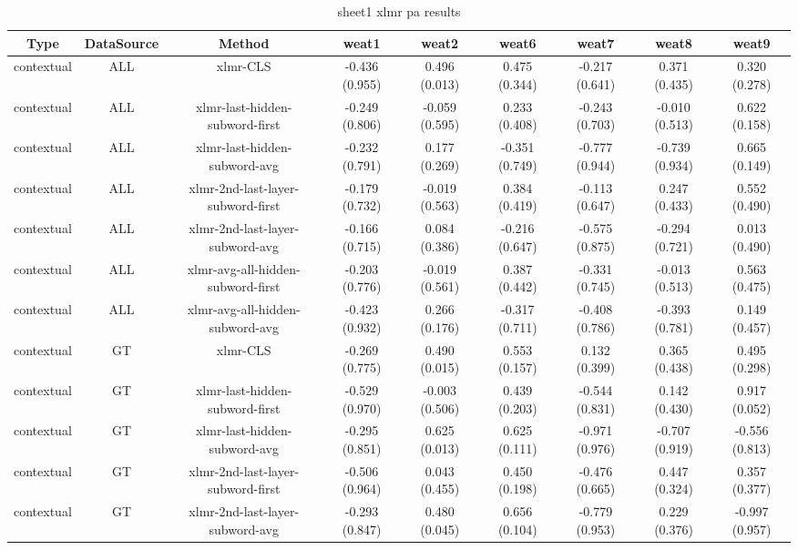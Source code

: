 \begin{sidewaystable}[htb]
    \centering
    \caption{sheet1 xlmr pa results}
    \label{appendix_tab:sheet1_xlmr_pa_results}
    \small
    \begin{tabular}{@{}ccccccccc@{}}
        \toprule
        Type & DataSource & Method & weat1 & weat2 & weat6 & weat7 & weat8 & weat9 \\
        \midrule
        contextual & ALL & xlmr-CLS & -0.436 (0.955) & 0.496 (0.013) & 0.475 (0.344) & -0.217 (0.641) & 0.371 (0.435) & 0.320 (0.278) \\
        contextual & ALL & xlmr-last-hidden-subword-first & -0.249 (0.806) & -0.059 (0.595) & 0.233 (0.408) & -0.243 (0.703) & -0.010 (0.513) & 0.622 (0.158) \\
        contextual & ALL & xlmr-last-hidden-subword-avg & -0.232 (0.791) & 0.177 (0.269) & -0.351 (0.749) & -0.777 (0.944) & -0.739 (0.934) & 0.665 (0.149) \\
        contextual & ALL & xlmr-2nd-last-layer-subword-first & -0.179 (0.732) & -0.019 (0.563) & 0.384 (0.419) & -0.113 (0.647) & 0.247 (0.433) & 0.552 (0.490) \\
        contextual & ALL & xlmr-2nd-last-layer-subword-avg & -0.166 (0.715) & 0.084 (0.386) & -0.216 (0.647) & -0.575 (0.875) & -0.294 (0.721) & 0.013 (0.490) \\
        contextual & ALL & xlmr-avg-all-hidden-subword-first & -0.203 (0.776) & -0.019 (0.561) & 0.387 (0.442) & -0.331 (0.745) & -0.013 (0.513) & 0.563 (0.475) \\
        contextual & ALL & xlmr-avg-all-hidden-subword-avg & -0.423 (0.932) & 0.266 (0.176) & -0.317 (0.711) & -0.408 (0.786) & -0.393 (0.781) & 0.149 (0.457) \\
        contextual & GT & xlmr-CLS & -0.269 (0.775) & 0.490 (0.015) & 0.553 (0.157) & 0.132 (0.399) & 0.365 (0.438) & 0.495 (0.298) \\
        contextual & GT & xlmr-last-hidden-subword-first & -0.529 (0.970) & -0.003 (0.506) & 0.439 (0.203) & -0.544 (0.831) & 0.142 (0.430) & 0.917 (0.052) \\
        contextual & GT & xlmr-last-hidden-subword-avg & -0.295 (0.851) & 0.625 (0.013) & 0.625 (0.111) & -0.971 (0.976) & -0.707 (0.919) & -0.556 (0.813) \\
        contextual & GT & xlmr-2nd-last-layer-subword-first & -0.506 (0.964) & 0.043 (0.455) & 0.450 (0.198) & -0.476 (0.665) & 0.447 (0.324) & 0.357 (0.377) \\
        contextual & GT & xlmr-2nd-last-layer-subword-avg & -0.293 (0.847) & 0.480 (0.045) & 0.656 (0.104) & -0.779 (0.953) & 0.229 (0.376) & -0.997 (0.957) \\

\end{tabular}
\end{sidewaystable}
